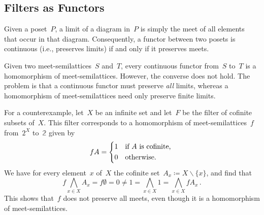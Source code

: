 \subsection{Filters as Functors}

Given a poset~$P$, a limit of a diagram in~$P$ is simply the meet of all elements that occur in that diagram.
Consequently, a functor between two posets is continuous (i.e., preserves limits) if and only if it preserves meets.

Given two meet-semilattices~$S$ and~$T$, every continuous functor from~$S$ to~$T$ is a homomorphism of meet-semilattices.
However, the converse does not hold.
The problem is that a continuous functor must preserve \emph{all} limits, whereas a homomorphism of meet-semilattices need only preserve finite limits.

For a counterexample, let~$X$ be an infinite set and let~$F$ be the filter of cofinite subsets of~$X$.
This filter corresponds to a homomorphism of meet-semilattices~$f$ from~$2^X$ to~$𝟚$ given by
\[
	f A
	=
	\begin{cases*}
		1 & if~$A$ is cofinite, \\
		0 & otherwise.
	\end{cases*}
\]
We have for every element~$x$ of~$X$ the cofinite set~$A_x ≔ X ∖ \{ x \}$, and find that
\[
	f ⋀_{x ∈ X} {} A_x
	= f ∅
	= 0 ≠ 1
	= ⋀_{x ∈ X} 1
	= ⋀_{x ∈ X} f A_x \,.
\]
This shows that~$f$ does not preserve all meets, even though it is a homomorphism of meet-semilattices.
